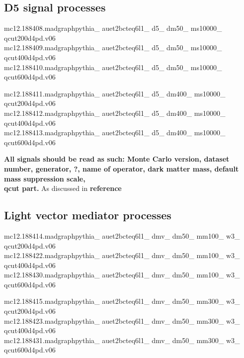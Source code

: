 \subsection{D5 signal processes}
mc12.188408.madgraphpythia\_  auet2bcteq6l1\_  d5\_  dm50\_  ms10000\_  \\ qcut200d4pd.v06\\
mc12.188409.madgraphpythia\_  auet2bcteq6l1\_  d5\_  dm50\_  ms10000\_  \\ qcut400d4pd.v06\\
mc12.188410.madgraphpythia\_  auet2bcteq6l1\_  d5\_  dm50\_  ms10000\_  \\ qcut600d4pd.v06

mc12.188411.madgraphpythia\_  auet2bcteq6l1\_  d5\_  dm400\_  ms10000\_  \\ qcut200d4pd.v06\\
mc12.188412.madgraphpythia\_  auet2bcteq6l1\_  d5\_  dm400\_  ms10000\_  \\ qcut400d4pd.v06\\
mc12.188413.madgraphpythia\_  auet2bcteq6l1\_  d5\_  dm400\_  ms10000\_  \\ qcut600d4pd.v06

\textbf{All signals should be read as such: Monte Carlo version, dataset number, generator, ?, name of operator,  dark matter mass, default mass suppression scale, \\ qcut part.} As discussed in \textbf{reference} \\ 
\subsection{Light vector mediator processes}
mc12.188414.madgraphpythia\_ auet2bcteq6l1\_ dmv\_ dm50\_ mm100\_ w3\_ \\ qcut200d4pd.v06\\ mc12.188422.madgraphpythia\_ auet2bcteq6l1\_ dmv\_ dm50\_ mm100\_ w3\_ \\ qcut400d4pd.v06\\
mc12.188430.madgraphpythia\_ auet2bcteq6l1\_ dmv\_ dm50\_ mm100\_ w3\_ \\ qcut600d4pd.v06
 
mc12.188415.madgraphpythia\_ auet2bcteq6l1\_ dmv\_ dm50\_ mm300\_ w3\_ \\ qcut200d4pd.v06\\
mc12.188423.madgraphpythia\_ auet2bcteq6l1\_ dmv\_ dm50\_ mm300\_ w3\_ \\ qcut400d4pd.v06\\
mc12.188431.madgraphpythia\_ auet2bcteq6l1\_ dmv\_ dm50\_ mm300\_ w3\_ \\ qcut600d4pd.v06

